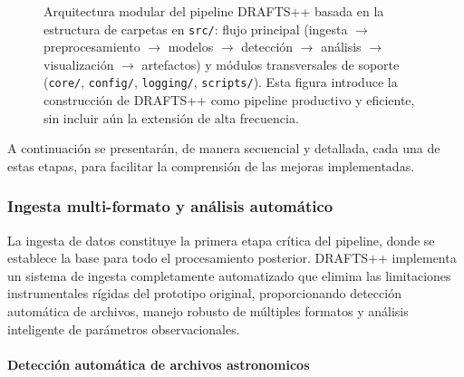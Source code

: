 \begin{figure}[H]
{}
\endgroup
\caption{Arquitectura modular del pipeline DRAFTS++ basada en la estructura de carpetas en \texttt{src/}: flujo principal (ingesta $\to$ preprocesamiento $\to$ modelos $\to$ detección $\to$ análisis $\to$ visualización $\to$ artefactos) y módulos transversales de soporte (\texttt{core/}, \texttt{config/}, \texttt{logging/}, \texttt{scripts/}). Esta figura introduce la construcción de DRAFTS++ como pipeline productivo y eficiente, sin incluir aún la extensión de alta frecuencia.}
\label{fig:workflow-src}
\end{figure}

A continuación se presentarán, de manera secuencial y detallada, cada una de estas etapas, para facilitar la comprensión de las mejoras implementadas.

\subsubsection{Ingesta multi-formato y análisis automático}

La ingesta de datos constituye la primera etapa crítica del pipeline, donde se establece la base para todo el procesamiento posterior. DRAFTS++ implementa un sistema de ingesta completamente automatizado que elimina las limitaciones instrumentales rígidas del prototipo original, proporcionando detección automática de archivos, manejo robusto de múltiples formatos y análisis inteligente de parámetros observacionales.

\paragraph{Detección automática de archivos astronomicos}

